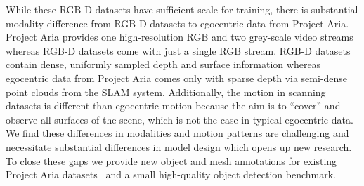 %
While these RGB-D datasets have sufficient scale for training, there is substantial modality difference from RGB-D datasets to egocentric data from Project Aria. 
Project Aria provides one high-resolution RGB and two grey-scale video streams whereas RGB-D datasets come with just a single RGB stream. RGB-D datasets contain dense, uniformly sampled depth and surface information whereas egocentric data from Project Aria comes only with sparse depth via semi-dense point clouds from the SLAM system.
Additionally, the motion in scanning datasets is different than egocentric motion because the aim is to ``cover'' and observe all surfaces of the scene, which is not the case in typical egocentric data.
We find these differences in modalities and motion patterns are challenging and necessitate substantial differences in model design which opens up new research.
To close these gaps we provide new object and mesh annotations for existing Project Aria datasets~\cite{ase2024web,Pan_2023_ICCV} and a small high-quality object detection benchmark. 


